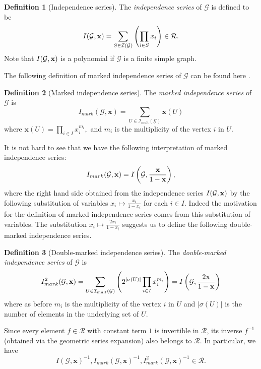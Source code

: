 \documentclass[11pt,reqno]{amsart}
\numberwithin{equation}{section} %
\theoremstyle{definition}
\newtheorem{defn}{Definition}
\theoremstyle{remark}
\numberwithin{equation}{section}
\begin{document}
\begin{defn}[Independence series]
  The \textit{independence series} of $\mathcal{G}$ is defined to be 
 $$I(\mathcal G, \bold x) = \sum\limits_{S\in \mathcal{I(G)}}\left(\prod\limits_{i\in S}x_i\right)\in \mathcal{R}.$$
 Note that $I(\mathcal G, \bold x)$ is a polynomial if $\mathcal{G}$ is a finite simple graph. 

 \end{defn}
The following definition of marked independence series of $\mathcal{G}$ can be found here \cite[Section 2.5]{CDV}.
\begin{defn}[Marked independence series]
 The \emph{marked independence series} of \(\mathcal G\) is
\[
I_{mark}(\mathcal G,\mathbf{x})
=
\sum_{U\in\mathcal{I}_{\mathrm{mult}}(\mathcal G)}
\mathbf{x}(U)
\] where $
\mathbf{x}(U)
=
\prod_{i\in I}x_i^{m_i},
$ and \(m_i\) is the multiplicity of the vertex \(i\) in \(U\).
\end{defn}
It is not hard to see that we have the following interpretation of marked independence series:
$$I_{mark}(\mathcal G,\mathbf{x}) = I\left(\mathcal{G}, \frac{\bold x}{1-\bold x}\right),$$
where the right hand side obtained from the independence series $I(\mathcal{G}, \bold x)$ by the following substitution of variables  $x_i\mapsto \frac{x_i}{1-x_i}$ for each $i\in I$.
Indeed the motivation for the definition of marked independence series comes from this substitution of variables. 
The substitution $x_i\mapsto \frac{2x_i}{1-x_i}$ suggests us to define the following double-marked independence series.
\begin{defn}[Double-marked independence series]
     The \emph{double-marked independence series} of \(\mathcal G\) is
\[
I_{mark}^2(\mathcal G,\mathbf{x})
=
\sum_{U\in\mathcal{I}_{\mathrm{mult}}(\mathcal G)} \left(2^{|\sigma(U)|}
\prod_{i\in I}x_i^{m_i}\right) = I\left(\mathcal{G}, \frac{2\bold x}{1-\bold x}\right)
\] where  as before \(m_i\) is the multiplicity of the vertex \(i\) in \(U\) and $|\sigma(U)|$ is the number of elements in the underlying set of $U.$
\end{defn}
Since every element $f\in \mathcal{R}$ with constant term $1$ is invertible in $\mathcal{R}$, its inverse $f^{-1}$  (obtained via the geometric series expansion) also belongs to $\mathcal{R}$. In particular, we have
$$I(\mathcal G,\mathbf{x})^{-1}, I_{mark}(\mathcal G,\mathbf{x})^{-1}, I_{mark}^2(\mathcal G,\mathbf{x})^{-1}\in \mathcal R.$$
\end{document}
